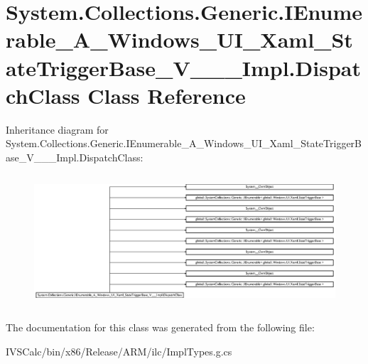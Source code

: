 \hypertarget{class_system_1_1_collections_1_1_generic_1_1_i_enumerable___a___windows___u_i___xaml___state_tri7ed831e5537a8642355e523f7d0110a5}{}\section{System.\+Collections.\+Generic.\+I\+Enumerable\+\_\+\+A\+\_\+\+Windows\+\_\+\+U\+I\+\_\+\+Xaml\+\_\+\+State\+Trigger\+Base\+\_\+\+V\+\_\+\+\_\+\+\_\+\+Impl.\+Dispatch\+Class Class Reference}
\label{class_system_1_1_collections_1_1_generic_1_1_i_enumerable___a___windows___u_i___xaml___state_tri7ed831e5537a8642355e523f7d0110a5}
Inheritance diagram for System.\+Collections.\+Generic.\+I\+Enumerable\+\_\+\+A\+\_\+\+Windows\+\_\+\+U\+I\+\_\+\+Xaml\+\_\+\+State\+Trigger\+Base\+\_\+\+V\+\_\+\+\_\+\+\_\+\+Impl.\+Dispatch\+Class\+:\begin{figure}[H]
\begin{center}
\leavevmode
\includegraphics[height=4.951768cm]{class_system_1_1_collections_1_1_generic_1_1_i_enumerable___a___windows___u_i___xaml___state_tri7ed831e5537a8642355e523f7d0110a5}
\end{center}
\end{figure}


The documentation for this class was generated from the following file\+:\begin{DoxyCompactItemize}
\item 
I\+V\+S\+Calc/bin/x86/\+Release/\+A\+R\+M/ilc/Impl\+Types.\+g.\+cs\end{DoxyCompactItemize}
